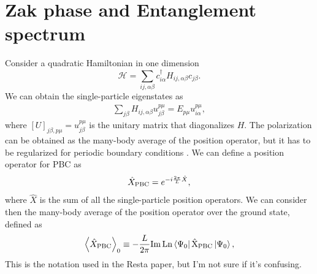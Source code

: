 \documentclass[twocolumn,amsmath,longbibliography,amssymb,superscriptaddress]{revtex4-1}
\newcommand{\carlos}[1]{{\color{red} #1}}
\begin{document}
\section{Zak phase and Entanglement spectrum}
Consider a quadratic Hamiltonian in one dimension
\begin{equation}
\mathcal{H} = \sum_{ij,\alpha\beta} c_{i\alpha}^\dagger H_{ij,\alpha \beta}c_{j\beta}.
\end{equation}
We can obtain the single-particle eigenstates as
\begin{align*}
\sum_{j\beta}H_{ij,\alpha\beta} u^{p\mu}_{j\beta} = E_{p\mu} u_{i\alpha}^{p\mu},
\end{align*}
where $[U]_{j\beta,p\mu} = u^{p\mu}_{j\beta}$ is the unitary matrix that diagonalizes $H$. The polarization can be obtained as the many-body average of the position operator, but it has to be regularized for periodic boundary conditions \cite{Resta1997}. We can define a position operator for PBC as
\begin{equation}
\hat{X}_{\rm PBC} = e^{-i\frac{2\pi}{L}\hat{X}},
\end{equation}
where $\hat{X}$ is the sum of all the single-particle position operators. We can consider then the many-body average of the position operator over the ground state, defined as
\begin{align*}
\expval{\hat{X}_{\rm PBC}}_0 \equiv -\frac{L}{2\pi} \rm{ Im\, Ln }\bra{\Psi_0}\hat{X}_{\rm PBC}\ket{\Psi_0},
\end{align*}
\carlos{This is the notation used in the Resta paper, but I'm not sure if it's confusing.}
\end{document}
